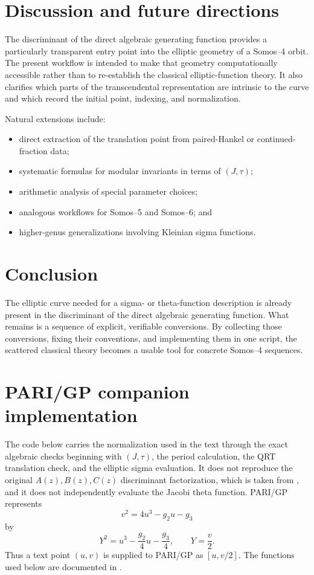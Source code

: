 \documentclass[11pt]{article}
\newcommand{\taupar}{\tau}
\begin{document}
\section{Discussion and future directions}
The discriminant of the direct algebraic generating function provides a
particularly transparent entry point into the elliptic geometry of a
Somos--4 orbit. The present workflow is intended to make that geometry
computationally accessible rather than to re-establish the classical
elliptic-function theory. It also clarifies which parts of the transcendental
representation are intrinsic to the curve and which record the initial
point, indexing, and normalization.

Natural extensions include:
\begin{itemize}[leftmargin=2em]
  \item direct extraction of the translation point from paired-Hankel or
        continued-fraction data;
  \item systematic formulas for modular invariants in terms of
        $(J,\taupar)$;
  \item arithmetic analysis of special parameter choices;
  \item analogous workflows for Somos--5 and Somos--6; and
  \item higher-genus generalizations involving Kleinian sigma functions.
\end{itemize}

\section{Conclusion}
The elliptic curve needed for a sigma- or theta-function description is
already present in the discriminant of the direct algebraic generating
function. What remains is a sequence of explicit, verifiable conversions. By
collecting those conversions, fixing their conventions, and implementing
them in one script, the scattered classical theory becomes a usable tool for
concrete Somos--4 sequences.

\appendix
\section{PARI/GP companion implementation}
\label{app:pari}
The code below carries the normalization used in the text through the exact
algebraic checks beginning with $(J,\taupar)$, the period calculation, the QRT
translation check, and the elliptic sigma evaluation. It does not reproduce
the original $A(z),B(z),C(z)$ discriminant factorization, which is taken from
\cite{Scheuerle2026}, and it does not independently evaluate the Jacobi theta
function. PARI/GP represents
\[
  v^2=4u^3-g_2u-g_3
\]
by
\[
  Y^2=u^3-\frac{g_2}{4}u-\frac{g_3}{4},
  \qquad Y=\frac{v}{2}.
\]
Thus a text point $(u,v)$ is supplied to PARI/GP as $[u,v/2]$. The functions
used below are documented in \cite{PARIGPManual}.
\end{document}
